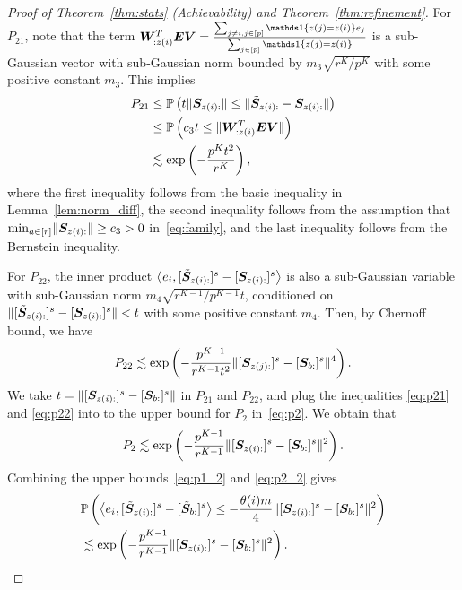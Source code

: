 \documentclass[journal]{IEEEtran}
\theoremstyle{definition}
\theoremstyle{definition}
\newcommand{\of}[1]{\left(#1\right)}
\newcommand{\ang}[1]{\left\langle#1\right\rangle}
\begin{document}
\begin{proof}[Proof of Theorem~\ref{thm:stats} (Achievability) and Theorem~\ref{thm:refinement}]
    For $P_{21}$, note that the term $\mW^T_{: z(i)} \mE \mV = \frac{ \sum_{ j \neq i, j \in [p]} \ind \{ z(j) = z(i) \} e_j }{\sum_{j \in [p]} \ind \{ z(j) = z(i) \} }$  is a sub-Gaussian vector with sub-Gaussian norm bounded by $m_3 \sqrt{r^K/ p^K}$ with some positive constant $m_3$. This implies
        \begin{align}
        P_{21} & \leq \bbP\of{ t \onormSize{}{\mS_{z(i):} } \leq \onormSize{}{ \tilde  \mS_{z(i):}  -  \mS_{z(i):} }  }\\
        & \leq \bbP\of{c_3 t \leq  \onormSize{}{ \mW^T_{: z(i)} \mE \mV  } } \\
        &\lesssim \exp\of{ - \frac{p^K t^2}{r^K} }, \label{eq:p21}
    \end{align}
    where the first inequality follows from the basic inequality in Lemma~\ref{lem:norm_diff}, the second inequality follows from the assumption that $ \min_{a \in [r]} \lVert\bm S_{z(i):}\rVert \geq c_3>0$ in~\eqref{eq:family}, and the last inequality follows from the Bernstein inequality.
    
    For $P_{22}$, the inner product $ \ang{e_i, [ \tilde  \mS_{z(i):} ]^s - [ \mS_{z(i):} ]^s}$ is also a sub-Gaussian variable with sub-Gaussian norm $ m_4 \sqrt{ r^{K-1}/ p^{K-1} } t$, conditioned on $\lVert [ \tilde  {\bm S}_{z(i):} ]^s - [ \bm S_{z(i):} ]^s \rVert < t$ with some positive constant $m_4$. Then, by Chernoff bound, we have 
    \begin{equation}\label{eq:p22}
        P_{22} \lesssim \exp \of{  - \frac{p^{K-1}}{r^{K-1} t^2}   \onormSize{}{ [ \mS_{z(j):}  ]^s - [ \mS_{b:}  ]^s  }^4 }. 
     \end{equation}
    We take $t =  \lVert [ \bm S_{z(i):}  ]^s - [ \bm S_{b:}  ]^s  \rVert$ in $P_{21}$ and $P_{22}$, and plug the inequalities \eqref{eq:p21} and \eqref{eq:p22} into to the upper bound for $P_2$ in~\eqref{eq:p2}. We obtain that 
    \begin{equation}\label{eq:p2_2}
        P_2 \lesssim \exp \of{  - \frac{p^{K-1}}{r^{K-1}}   \onormSize{}{ [ \mS_{z(i):}  ]^s - [ \mS_{b:}  ]^s  }^2 }.
    \end{equation}
    Combining the upper bounds~\eqref{eq:p1_2} and \eqref{eq:p2_2} gives 
    \begin{align}
        &\bbP \of{ \ang{ e_i, [  \tilde \mS_{z(i):} ]^s - [  \tilde \mS_{b:} ]^s }  \leq - \frac{\theta(i) m}{4} \onormSize{}{ [ \mS_{z(i):}  ]^s - [ \mS_{b:}  ]^s  }^2} \\
        & \lesssim  \exp \of{  - \frac{p^{K-1}}{r^{K-1}}   \onormSize{}{ [ \mS_{z(i):}  ]^s - [ \mS_{b:}  ]^s  }^2 }.\label{eq:xi_p}
    \end{align}


\end{proof}
\end{document}
